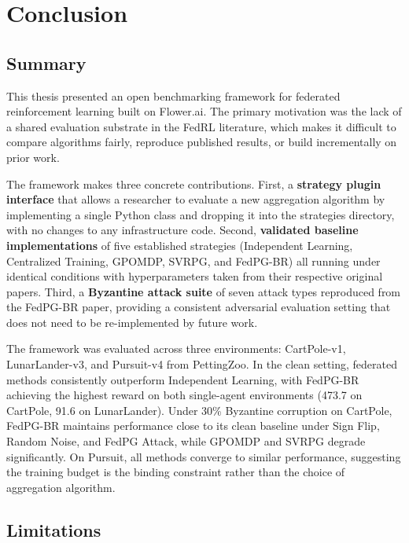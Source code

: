 \documentclass[a4paper, oneside]{discothesis}
\begin{document}
\chapter{Conclusion}
\label{chap:conclusion}

\section{Summary}

This thesis presented an open benchmarking framework for federated reinforcement learning built on Flower.ai. The primary motivation was the lack of a shared evaluation substrate in the FedRL literature, which makes it difficult to compare algorithms fairly, reproduce published results, or build incrementally on prior work.

The framework makes three concrete contributions. First, a \textbf{strategy plugin interface} that allows a researcher to evaluate a new aggregation algorithm by implementing a single Python class and dropping it into the strategies directory, with no changes to any infrastructure code. Second, \textbf{validated baseline implementations} of five established strategies (Independent Learning, Centralized Training, GPOMDP, SVRPG, and FedPG-BR) all running under identical conditions with hyperparameters taken from their respective original papers. Third, a \textbf{Byzantine attack suite} of seven attack types reproduced from the FedPG-BR paper, providing a consistent adversarial evaluation setting that does not need to be re-implemented by future work.

The framework was evaluated across three environments: CartPole-v1, \linebreak LunarLander-v3, and Pursuit-v4 from PettingZoo. In the clean setting, federated methods consistently outperform Independent Learning, with FedPG-BR achieving the highest reward on both single-agent environments (473.7 on CartPole, 91.6 on LunarLander). Under 30\% Byzantine corruption on CartPole, FedPG-BR maintains performance close to its clean baseline under Sign Flip, Random Noise, and FedPG Attack, while GPOMDP and SVRPG degrade significantly. On Pursuit, all methods converge to similar performance, suggesting the training budget is the binding constraint rather than the choice of aggregation algorithm.

\section{Limitations}
\end{document}
